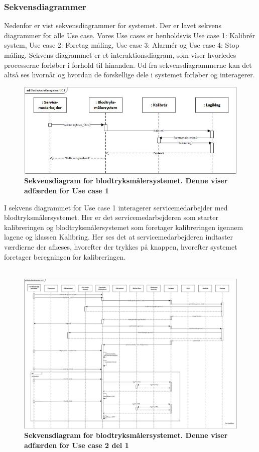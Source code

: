 \subsubsection{Sekvensdiagrammer}
Nedenfor er vist sekvensdiagrammer for systemet. Der er lavet sekvens diagrammer for alle Use case. Vores Use cases er henholdsvis Use case 1: Kalibrér system, Use case 2: Foretag måling, Use case 3: Alarmér og Use case 4: Stop måling. Sekvens diagrammet er et interaktionsdiagram, som viser hvorledes processerne forløber i forhold til hinanden. Ud fra sekvensdiagrammerne kan det altså ses hvornår og hvordan de forskellige dele i systemet forløber og interagerer. \\
\begin{figure}[H]
\includegraphics[width =1.0\textwidth , center]{billeder/sdUC1}
\caption{\textbf{Sekvensdiagram for blodtryksmålersystemet. Denne viser adfærden for Use case 1 }}
\end{figure}
I sekvens diagrammet for Use case 1 interagerer servicemedarbejder med blodtryksmålersystemet. Her er det servicemedarbejderen som starter kalibreringen og blodtryksmålersystemet som foretager kalibreringen igennem lagene og klassen Kalibring. Her ses det at servicemedarbejderen indtaster værdierne der aflæses, hvorefter der trykkes på knappen, hvorefter systemet foretager beregningen for kalibreringen.\\\\ 
\begin{figure}[H]
\includegraphics[width =1.0\textwidth , center]{billeder/sdUC2}
\caption{\textbf{Sekvensdiagram for blodtryksmålersystemet. Denne viser adfærden for Use case 2 del 1}}
\end{figure}

